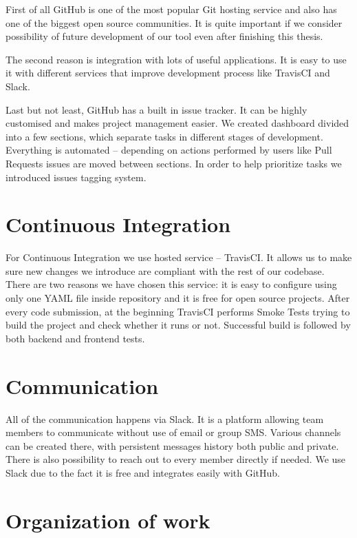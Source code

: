 \documentclass[licencjacka,en]{thesisclass}
\begin{document}
    First of all GitHub\cite{GitHub} is one of the most popular Git hosting service and also has one of the biggest open source communities.
    It is quite important if we consider possibility of future development of our tool even after finishing this thesis.

    The second reason is integration with lots of useful applications.
    It is easy to use it with different services that improve development process like TravisCI\cite{TravisCI} and Slack\cite{Slack}.

    Last but not least, GitHub has a built in issue tracker.
    It can be highly customised and makes project management easier.
    We created dashboard divided into a few sections, which separate tasks in different stages of development.
    Everything is automated -- depending on actions performed by users like Pull Requests issues are moved between sections.
    In order to help prioritize tasks we introduced issues tagging system.

    \section{Continuous Integration}

    For Continuous Integration we use hosted service -- TravisCI. It allows us to make sure new changes we introduce are compliant with the rest of our codebase.
    There are two reasons we have chosen this service: it is easy to configure using only one YAML file inside repository and it is free for open source projects.
    After every code submission, at the beginning TravisCI performs Smoke Tests trying to build the project and check whether it runs or not.
    Successful build is followed by both backend and frontend tests.

    \section{Communication}

    All of the communication happens via Slack.
    It is a platform allowing team members to communicate without use of email or group SMS.
    Various channels can be created there, with persistent messages history both public and private.
    There is also possibility to reach out to every member directly if needed.
    We use Slack due to the fact it is free and integrates easily with GitHub.

    \section{Organization of work}
\end{document}
